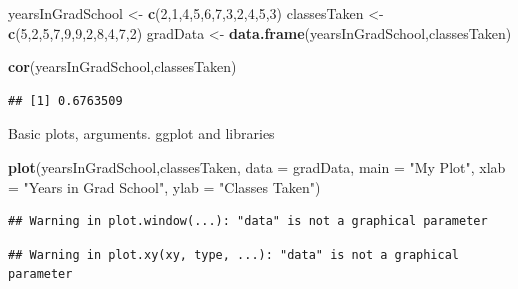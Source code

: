 \documentclass[]{book}
\newenvironment{Shaded}{\begin{snugshade}}{\end{snugshade}}
\newcommand{\KeywordTok}[1]{\textcolor[rgb]{0.13,0.29,0.53}{\textbf{#1}}}
\newcommand{\DataTypeTok}[1]{\textcolor[rgb]{0.13,0.29,0.53}{#1}}
\newcommand{\DecValTok}[1]{\textcolor[rgb]{0.00,0.00,0.81}{#1}}
\newcommand{\StringTok}[1]{\textcolor[rgb]{0.31,0.60,0.02}{#1}}
\newcommand{\NormalTok}[1]{#1}
\theoremstyle{definition}
\theoremstyle{definition}
\theoremstyle{definition}
\theoremstyle{remark}
\begin{document}
\begin{Shaded}
\begin{Highlighting}[]
\NormalTok{yearsInGradSchool <-}\StringTok{ }\KeywordTok{c}\NormalTok{(}\DecValTok{2}\NormalTok{,}\DecValTok{1}\NormalTok{,}\DecValTok{4}\NormalTok{,}\DecValTok{5}\NormalTok{,}\DecValTok{6}\NormalTok{,}\DecValTok{7}\NormalTok{,}\DecValTok{3}\NormalTok{,}\DecValTok{2}\NormalTok{,}\DecValTok{4}\NormalTok{,}\DecValTok{5}\NormalTok{,}\DecValTok{3}\NormalTok{)}
\NormalTok{classesTaken <-}\StringTok{ }\KeywordTok{c}\NormalTok{(}\DecValTok{5}\NormalTok{,}\DecValTok{2}\NormalTok{,}\DecValTok{5}\NormalTok{,}\DecValTok{7}\NormalTok{,}\DecValTok{9}\NormalTok{,}\DecValTok{9}\NormalTok{,}\DecValTok{2}\NormalTok{,}\DecValTok{8}\NormalTok{,}\DecValTok{4}\NormalTok{,}\DecValTok{7}\NormalTok{,}\DecValTok{2}\NormalTok{)}
\NormalTok{gradData <-}\StringTok{ }\KeywordTok{data.frame}\NormalTok{(yearsInGradSchool,classesTaken)}
\end{Highlighting}
\end{Shaded}

\begin{Shaded}
\begin{Highlighting}[]
\KeywordTok{cor}\NormalTok{(yearsInGradSchool,classesTaken)}
\end{Highlighting}
\end{Shaded}

\begin{verbatim}
## [1] 0.6763509
\end{verbatim}

Basic plots, arguments. ggplot and libraries

\begin{Shaded}
\begin{Highlighting}[]
\KeywordTok{plot}\NormalTok{(yearsInGradSchool,classesTaken, }
     \DataTypeTok{data =}\NormalTok{ gradData, }
     \DataTypeTok{main =} \StringTok{"My Plot"}\NormalTok{, }
     \DataTypeTok{xlab =} \StringTok{"Years in Grad School"}\NormalTok{, }
     \DataTypeTok{ylab =} \StringTok{"Classes Taken"}\NormalTok{)}
\end{Highlighting}
\end{Shaded}

\begin{verbatim}
## Warning in plot.window(...): "data" is not a graphical parameter
\end{verbatim}

\begin{verbatim}
## Warning in plot.xy(xy, type, ...): "data" is not a graphical parameter
\end{verbatim}
\end{document}

